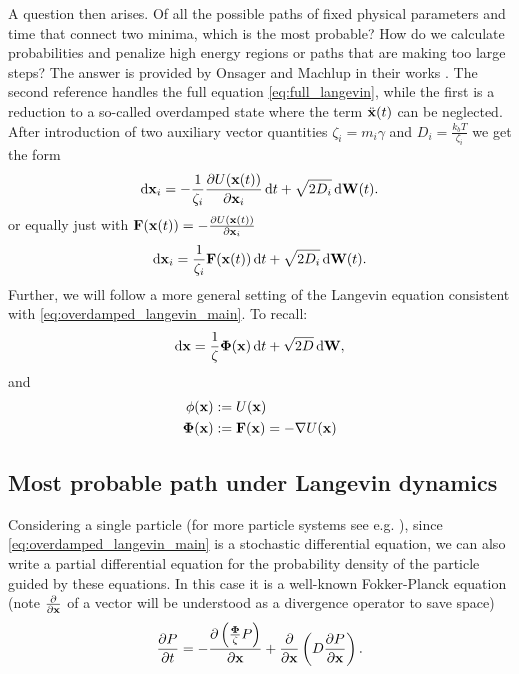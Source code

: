 A question then arises. Of all the possible paths of fixed physical parameters and time that connect two minima, which is the most probable? How do we calculate probabilities and penalize high energy regions or paths that are making too large steps? The answer is provided by Onsager and Machlup in their works \cite{OMIbasic, OMIIKinetic}. The second reference handles the full equation \eqref{eq:full_langevin}, while the first is a reduction to a so-called overdamped state where the term $\Ddot{\mathbf{x}}(t)$ can be neglected. After introduction of two auxiliary vector quantities $\zeta_i = m_i \gamma$ and $D_i = \frac{k_b T}{\zeta_i}$ we get the form
\begin{equation}
    \odif{\xx}_i = - \frac{1}{\zeta_i} \frac{\partial U(\xx(t))}{\partial \xx_i}\odif{t} + \sqrt{2 D_i} \odif{\mb{W}(t)}.
\end{equation}
or equally just with $\mathbf{F}(\mathbf{x}(t)) = - \frac{\partial U(\mathbf{x}(t))}{\partial \mathbf{x}_i}$
\begin{equation}
    \odif{\xx}_i = \frac{1}{\zeta_i} \mb{F}(\xx(t))\odif{t} + \sqrt{2 D_i} \odif{\mb{W}(t)}.
\end{equation}
Further, we will follow a more general setting of the Langevin equation consistent with \eqref{eq:overdamped_langevin_main}. To recall:
\begin{equation}
    \label{eq:overdamped_langevin_apendix}
    \odif{\xx} = \frac{1}{\zeta}\mathbf{\Phi(x)}\odif{t} + \sqrt{2 D} \odif{\mb{W}},
\end{equation}
and
\begin{align}
    \phi(\mathbf{x}) &:= U(\mathbf{x}) \\
    \mathbf{\Phi}(\mathbf{x}) &:= \mathbf{F}(\mathbf{x}) = -\nabla U(\mathbf{x})
\end{align}
\subsection{Most probable path under Langevin dynamics}
Considering a single particle (for more particle systems see e.g. \cite{PhysRevResearch.2.023407}), since \eqref{eq:overdamped_langevin_main} is a stochastic differential equation, we can also write a partial differential equation for the probability density of the particle guided by these equations. In this case it is a well-known Fokker-Planck equation (note $
\frac{\partial}{\partial \mathbf{x}}$ of a vector will be understood as a divergence operator to save space)
\begin{equation}\label{eq:fokker_planck}
    \frac{\partial P}{\partial t} = - \frac{\partial \left( \frac{\mathbf{\Phi}}{\zeta} P \right)}{\partial \mathbf{x}} + \frac{ \partial }{\partial \mathbf{x}} \left(D \frac{\partial P}{\partial \mathbf{x}} \right).
\end{equation}

